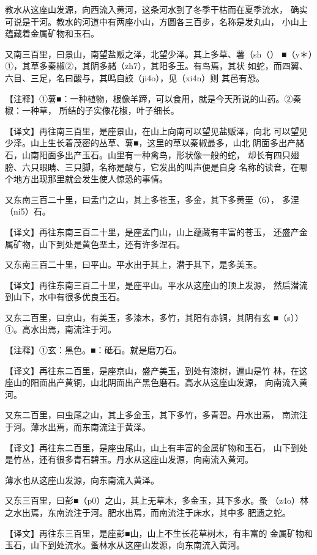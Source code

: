 \documentclass[a4paper,12pt,UTF8,twoside]{ctexbook}
\begin{document}
教水从这座山发源，向西流入黄河，这条河水到了冬季干枯而在夏季流水， 确实可说是干河。教水的河道中有两座小山，方圆各三百步，名称是发丸山， 小山上蕴藏着金属矿物和玉石。

又南三百里，曰景山，南望盐贩之泽，北望少泽。其上多草、薯（sh（） ■（y＊）①，其草多秦椒②，其阴多赭（zh7），其阳多玉。有鸟焉，其状 如蛇，而四翼、六目、三足，名曰酸与，其鸣自詨（ji4o），见（xi4n）则 其邑有恐。

【注释】①薯■：一种植物，根像羊蹄，可以食用，就是今天所说的山药。②秦椒：一种草， 所结的子实像花椒，叶子细长。

【译文】再往南三百里，是座景山，在山上向南可以望见盐贩泽，向北 可以望见少泽。山上生长着茂密的丛草、薯■，这里的草以秦椒最多，山北 阴面多出产赭石，山南阳面多出产玉石。山里有一种禽鸟，形状像一般的蛇， 却长有四只翅膀、六只眼睛、三只脚，名称是酸与，它发出的叫声便是自身 名称的读音，在哪个地方出现那里就会发生使人惊恐的事情。

又东南三百二十里，曰孟门之山，其上多苍玉，多金，其下多黄垩（6）， 多涅（ni5）石。

【译文】再往东南三百二十里，是座孟门山，山上蕴藏有丰富的苍玉， 还盛产金属矿物，山下到处是黄色垩土，还有许多涅石。

又东南三百二十里，曰平山。平水出于其上，潜于其下，是多美玉。

【译文】再往东南三百二十里，是座平山。平水从这座山的顶上发源， 然后潜流到山下，水中有很多优良玉石。

又东二百里，曰京山，有美玉，多漆木，多竹，其阳有赤铜，其阴有玄 ■（s））①。高水出焉，南流注于河。

【注释】①玄：黑色。■：砥石。就是磨刀石。

【译文】再往东二百里，是座京山，盛产美玉，到处有漆树，遍山是竹 林，在这座山的阳面出产黄铜，山北阴面出产黑色磨石。高水从这座山发源， 向南流入黄河。

又东二百里，曰虫尾之山，其上多金玉，其下多竹，多青碧。丹水出焉， 南流注于河。薄水出焉，而东南流注于黄泽。

【译文】再往东二百里，是座虫尾山，山上有丰富的金属矿物和玉石， 山下到处是竹丛，还有很多青石碧玉。丹水从这座山发源，向南流入黄河。

薄水也从这座山发源，向东南流入黄泽。

又东三百里，曰彭■（p0）之山，其上无草木，多金玉，其下多水。蚤 （z4o）林之水出焉，东南流注于河。肥水出焉，而南流注于床水，其中多 肥遗之蛇。

【译文】再往东三百里，是座彭■山，山上不生长花草树木，有丰富的 金属矿物和玉石，山下到处流水。蚤林水从这座山发源，向东南流入黄河。
\end{document}
